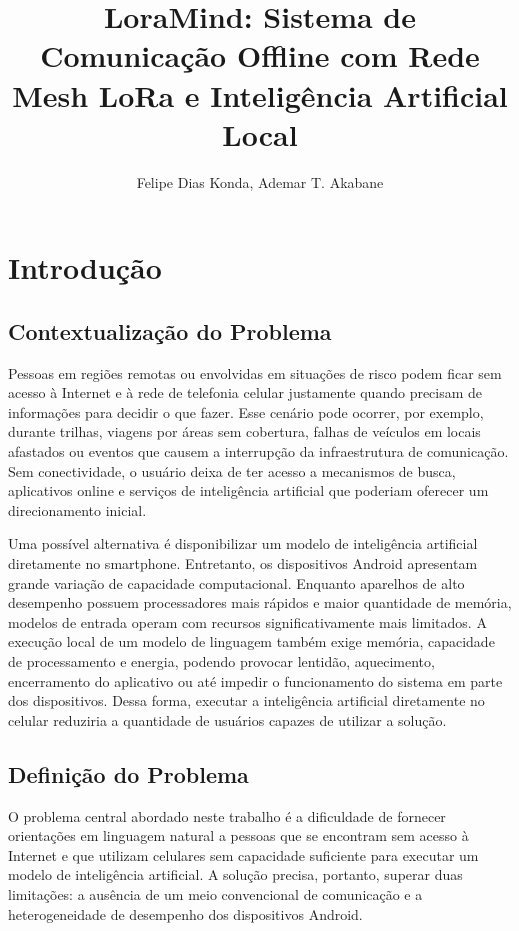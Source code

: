 \documentclass[12pt]{article}
\title{LoraMind: Sistema de Comunicação Offline com Rede Mesh LoRa e Inteligência Artificial Local}
\author{Felipe Dias Konda\inst{1}, Ademar T. Akabane\inst{1}}
\begin{document}
\maketitle


\section{Introdução}
\label{sec:introducao}

\subsection*{Contextualização do Problema}

Pessoas em regiões remotas ou envolvidas em situações de risco podem ficar sem acesso à Internet e à rede de telefonia celular justamente quando precisam de informações para decidir o que fazer. Esse cenário pode ocorrer, por exemplo, durante trilhas, viagens por áreas sem cobertura, falhas de veículos em locais afastados ou eventos que causem a interrupção da infraestrutura de comunicação. Sem conectividade, o usuário deixa de ter acesso a mecanismos de busca, aplicativos online e serviços de inteligência artificial que poderiam oferecer um direcionamento inicial.

Uma possível alternativa é disponibilizar um modelo de inteligência artificial diretamente no smartphone. Entretanto, os dispositivos Android apresentam grande variação de capacidade computacional. Enquanto aparelhos de alto desempenho possuem processadores mais rápidos e maior quantidade de memória, modelos de entrada operam com recursos significativamente mais limitados. A execução local de um modelo de linguagem também exige memória, capacidade de processamento e energia, podendo provocar lentidão, aquecimento, encerramento do aplicativo ou até impedir o funcionamento do sistema em parte dos dispositivos. Dessa forma, executar a inteligência artificial diretamente no celular reduziria a quantidade de usuários capazes de utilizar a solução.

\subsection*{Definição do Problema}

O problema central abordado neste trabalho é a dificuldade de fornecer orientações em linguagem natural a pessoas que se encontram sem acesso à Internet e que utilizam celulares sem capacidade suficiente para executar um modelo de inteligência artificial. A solução precisa, portanto, superar duas limitações: a ausência de um meio convencional de comunicação e a heterogeneidade de desempenho dos dispositivos Android.
\end{document}

